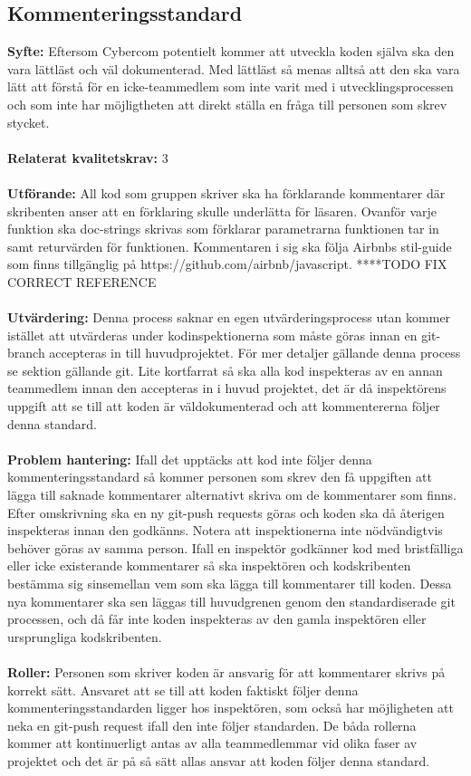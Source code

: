 \documentclass[10pt]{article}
\begin{document}
	\subsection{Kommenteringsstandard}
	\textbf{Syfte:}	Eftersom Cybercom potentielt kommer att utveckla koden själva ska den vara lättläst och väl dokumenterad. Med lättläst så menas alltså att den ska vara lätt att förstå för en icke-teammedlem som inte varit med i utvecklingsprocessen och som inte har möjligtheten att direkt ställa en fråga till personen som skrev stycket.
	\\\\
	\textbf{Relaterat kvalitetskrav:} 3
	\\\\
	\textbf{Utförande:} All kod som gruppen skriver ska ha förklarande kommentarer där skribenten anser att en förklaring skulle underlätta för läsaren. Ovanför varje funktion ska doc-strings skrivas som förklarar parametrarna funktionen tar in samt returvärden för funktionen.
	Kommentaren i sig ska följa Airbnbs stil-guide som finns tillgänglig på https://github.com/airbnb/javascript.
	****TODO FIX CORRECT REFERENCE
	\\\\
	\textbf{Utvärdering:} Denna process saknar en egen utvärderingsprocess utan kommer istället att utvärderas under kodinspektionerna som måste göras innan en git-branch accepteras in till huvudprojektet. För mer detaljer gällande denna process se sektion gällande git. Lite kortfarrat så ska alla kod inspekteras av en annan teammedlem innan den accepteras in i huvud projektet, det är då inspektörens uppgift att se till att koden är väldokumenterad och att kommentererna följer denna standard. 
	\\\\
	\textbf{Problem hantering:} Ifall det upptäcks att kod inte följer denna kommenteringsstandard så kommer personen som skrev den få uppgiften att lägga till saknade kommentarer alternativt skriva om de kommentarer som finns. Efter omskrivning ska en ny git-push requests göras och koden ska då återigen inspekteras innan den godkänns. Notera att inspektionerna inte nödvändigtvis behöver göras av samma person.
	Ifall en inspektör godkänner kod med bristfälliga eller icke existerande kommentarer så ska inspektören och kodskribenten bestämma sig sinsemellan vem som ska lägga till kommentarer till koden. Dessa nya kommentarer ska sen läggas till huvudgrenen genom den standardiserade git processen, och då får inte koden inspekteras av den gamla inspektören eller ursprungliga kodskribenten.
	\\\\
	\textbf{Roller:} Personen som skriver koden är ansvarig för att kommentarer skrivs på korrekt sätt. Ansvaret att se till att koden faktiskt följer denna kommenteringsstandarden ligger hos inspektören, som också har möjligheten att neka en git-push request ifall den inte följer standarden. De båda rollerna kommer att kontinuerligt antas av alla teammedlemmar vid olika faser av projektet och det är på så sätt allas ansvar att koden följer denna standard.
	\\
	
\end{document}
